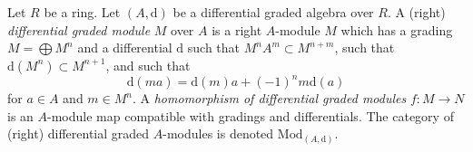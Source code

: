 \begin{definition}
\label{definition-dgm}
Let $R$ be a ring.
Let $(A, \text{d})$ be a differential graded algebra over $R$.
A (right) {\it differential graded module} $M$ over $A$ is a right $A$-module
$M$ which has a grading $M = \bigoplus M^n$ and a differential $\text{d}$
such that $M^n A^m \subset M^{n + m}$, such that
$\text{d}(M^n) \subset M^{n + 1}$, and such that
$$
\text{d}(ma) = \text{d}(m)a + (-1)^n m\text{d}(a)
$$
for $a \in A$ and $m \in M^n$. A
{\it homomorphism of differential graded modules} $f : M \to N$
is an $A$-module map compatible with gradings and differentials.
The category of (right) differential graded $A$-modules is denoted
$\text{Mod}_{(A, \text{d})}$.
\end{definition}